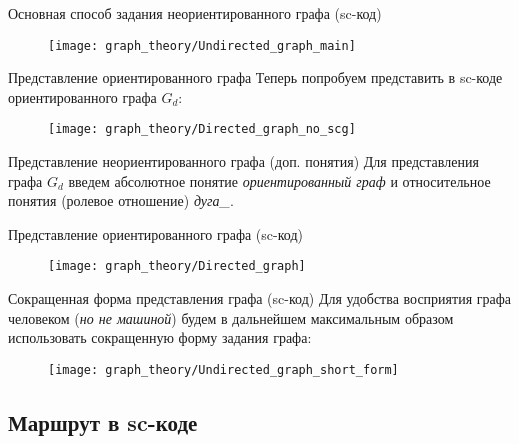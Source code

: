 \documentclass[hyperref={pdftex,unicode}]{beamer}
\begin{document}
\begin{frame}{Основная способ задания неориентированного графа (sc-код)}
  \begin{figure}
    \centering
    \texttt{[image: graph\_theory/Undirected\_graph\_main]}
  \end{figure}
\end{frame}

\begin{frame}{Представление ориентированного графа}
  Теперь попробуем представить в sc-коде ориентированного графа $G_d$:

  \begin{figure}
    \centering
    \texttt{[image: graph\_theory/Directed\_graph\_no\_scg]}
  \end{figure}
\end{frame}

\begin{frame}{Представление неориентированного графа (доп. понятия)}
  Для представления графа $G_d$ введем абсолютное понятие
  \emph{ориентированный граф} и относительное понятия (ролевое отношение)
  \emph{дуга\_}.
\end{frame}

\begin{frame}{Представление ориентированного графа (sc-код)}
  \begin{figure}
    \centering
    \texttt{[image: graph\_theory/Directed\_graph]}
  \end{figure}
\end{frame}

\begin{frame}{Сокращенная форма представления графа (sc-код)}
  Для удобства восприятия графа человеком (\emph{но не машиной})
  будем в дальнейшем максимальным образом использовать сокращенную
  форму задания графа:
  
  \begin{figure}
    \centering
    \texttt{[image: graph\_theory/Undirected\_graph\_short\_form]}
  \end{figure}
\end{frame}

\subsection{Маршрут в sc-коде}
\end{document}
